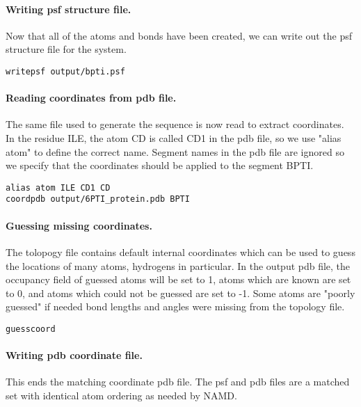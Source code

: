 \paragraph*{Writing psf structure file.}


Now that all of the atoms and bonds have been created, we can write
out the psf structure file for the system.

\begin{verbatim}
writepsf output/bpti.psf
\end{verbatim}

\paragraph*{Reading coordinates from pdb file.}


The same file used to generate the sequence is now read to extract
coordinates.  In the residue ILE, the atom CD is called CD1 in the
pdb file, so we use "alias atom" to define the correct name.  Segment
names in the pdb file are ignored so we specify that the coordinates
should be applied to the segment BPTI.

\begin{verbatim}
alias atom ILE CD1 CD
coordpdb output/6PTI_protein.pdb BPTI
\end{verbatim}

\paragraph*{Guessing missing coordinates.}


The tolopogy file contains default internal coordinates which can be
used to guess the locations of many atoms, hydrogens in particular.
In the output pdb file, the occupancy field of guessed atoms will be
set to 1, atoms which are known are set to 0, and atoms which could
not be guessed are set to -1.  Some atoms are "poorly guessed" if
needed bond lengths and angles were missing from the topology file.

\begin{verbatim}
guesscoord
\end{verbatim}

\paragraph*{Writing pdb coordinate file.}


This ends the matching coordinate pdb file.  The psf and pdb files
are a matched set with identical atom ordering as needed by NAMD.

